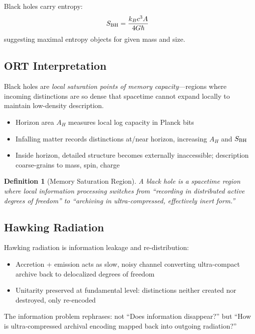 \documentclass[12pt,a4paper]{article}
\newtheorem{definition}{Definition}
\begin{document}
Black holes carry entropy:
\begin{equation}
    S_{\rm BH} = \frac{k_B c^3 A}{4 G\hbar}
\end{equation}
suggesting maximal entropy objects for given mass and size.

\subsection{ORT Interpretation}

Black holes are \emph{local saturation points of memory capacity}---regions where incoming distinctions are so dense that spacetime cannot expand locally to maintain low-density description.

\begin{itemize}
    \item Horizon area $A_H$ measures local log capacity in Planck bits
    \item Infalling matter records distinctions at/near horizon, increasing $A_H$ and $S_{\rm BH}$
    \item Inside horizon, detailed structure becomes externally inaccessible; description coarse-grains to mass, spin, charge
\end{itemize}

\begin{definition}[Memory Saturation Region]
A black hole is a spacetime region where local information processing switches from ``recording in distributed active degrees of freedom'' to ``archiving in ultra-compressed, effectively inert form.''
\end{definition}

\subsection{Hawking Radiation}

Hawking radiation is information leakage and re-distribution:
\begin{itemize}
    \item Accretion + emission acts as slow, noisy channel converting ultra-compact archive back to delocalized degrees of freedom
    \item Unitarity preserved at fundamental level: distinctions neither created nor destroyed, only re-encoded
\end{itemize}

The information problem rephrases: not ``Does information disappear?'' but ``How is ultra-compressed archival encoding mapped back into outgoing radiation?''
\end{document}
